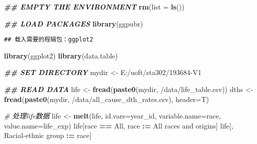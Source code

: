 \documentclass[
]{article}
\newenvironment{Shaded}{\begin{snugshade}}{\end{snugshade}}
\newcommand{\AttributeTok}[1]{\textcolor[rgb]{0.13,0.29,0.53}{#1}}
\newcommand{\CommentTok}[1]{\textcolor[rgb]{0.56,0.35,0.01}{\textit{#1}}}
\newcommand{\DocumentationTok}[1]{\textcolor[rgb]{0.56,0.35,0.01}{\textbf{\textit{#1}}}}
\newcommand{\FunctionTok}[1]{\textcolor[rgb]{0.13,0.29,0.53}{\textbf{#1}}}
\newcommand{\NormalTok}[1]{#1}
\newcommand{\OtherTok}[1]{\textcolor[rgb]{0.56,0.35,0.01}{#1}}
\newcommand{\SpecialCharTok}[1]{\textcolor[rgb]{0.81,0.36,0.00}{\textbf{#1}}}
\newcommand{\StringTok}[1]{\textcolor[rgb]{0.31,0.60,0.02}{#1}}
\begin{document}
\begin{Shaded}
\begin{Highlighting}[]
\DocumentationTok{\#\# EMPTY THE ENVIRONMENT}
\FunctionTok{rm}\NormalTok{(}\AttributeTok{list =} \FunctionTok{ls}\NormalTok{())}

\DocumentationTok{\#\# LOAD PACKAGES}
\FunctionTok{library}\NormalTok{(ggpubr)}
\end{Highlighting}
\end{Shaded}

\begin{verbatim}
## 载入需要的程辑包：ggplot2
\end{verbatim}

\begin{Shaded}
\begin{Highlighting}[]
\FunctionTok{library}\NormalTok{(ggplot2)}
\FunctionTok{library}\NormalTok{(data.table)}



\DocumentationTok{\#\# SET DIRECTORY}
\NormalTok{mydir }\OtherTok{\textless{}{-}} \StringTok{\textquotesingle{}E:/uoft/sta302/193684{-}V1\textquotesingle{}}

\DocumentationTok{\#\# READ DATA}
\NormalTok{life }\OtherTok{\textless{}{-}} \FunctionTok{fread}\NormalTok{(}\FunctionTok{paste0}\NormalTok{(mydir, }\StringTok{\textquotesingle{}/data/life\_table.csv\textquotesingle{}}\NormalTok{))}
\NormalTok{dths }\OtherTok{\textless{}{-}} \FunctionTok{fread}\NormalTok{(}\FunctionTok{paste0}\NormalTok{(mydir, }\StringTok{\textquotesingle{}/data/all\_cause\_dth\_rates.csv\textquotesingle{}}\NormalTok{), }\AttributeTok{header=}\NormalTok{T)}

\CommentTok{\# 处理life数据}
\NormalTok{life }\OtherTok{\textless{}{-}} \FunctionTok{melt}\NormalTok{(life, }\AttributeTok{id.vars=}\StringTok{\textquotesingle{}year\_id\textquotesingle{}}\NormalTok{, }\AttributeTok{variable.name=}\StringTok{\textquotesingle{}race\textquotesingle{}}\NormalTok{, }\AttributeTok{value.name=}\StringTok{\textquotesingle{}life\_exp\textquotesingle{}}\NormalTok{)}
\NormalTok{life[race }\SpecialCharTok{==} \StringTok{\textquotesingle{}All\textquotesingle{}}\NormalTok{, race }\SpecialCharTok{:=} \StringTok{\textquotesingle{}All races and origins\textquotesingle{}}\NormalTok{]}
\NormalTok{life[, }\StringTok{\textasciigrave{}}\AttributeTok{Racial{-}ethnic group}\StringTok{\textasciigrave{}} \SpecialCharTok{:=}\NormalTok{ race]}
\end{Highlighting}
\end{Shaded}
\end{document}
